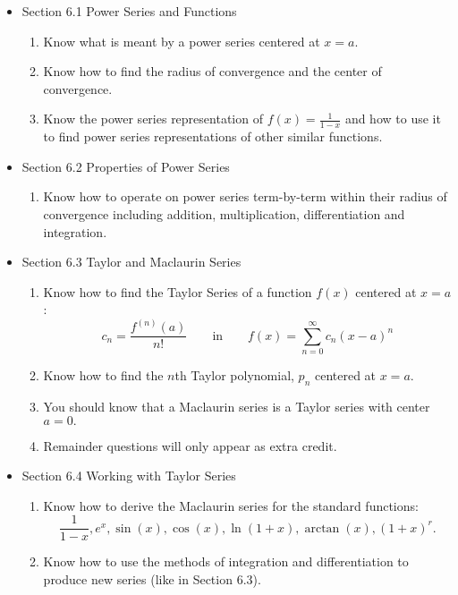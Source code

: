 \documentclass[11pt,fleqn]{article}
\begin{document}
\begin{itemize}
\item Section 6.1 Power Series and Functions\\

	\begin{enumerate}
	\item Know what is meant by a power series centered at $x=a.$
	\item Know how to find the radius of convergence and the center of convergence.
	\item Know the power series representation of $f(x)=\frac{1}{1-x}$ and how to use it to find power series representations of other similar functions.
	\end{enumerate}

\item Section 6.2 Properties of Power Series\\

	\begin{enumerate}
	\item Know how to operate on power series term-by-term within their radius of convergence including addition, multiplication, differentiation and integration.
	\end{enumerate}

\item Section 6.3 Taylor and Maclaurin Series\\

	\begin{enumerate}
	\item Know how to find the Taylor Series of a function $f(x)$ centered at $x=a$:
	$$c_n = \frac{f^{(n)}(a)}{n!} \qquad \text{in} \qquad f(x) = \sum_{n=0}^\infty c_n (x-a)^n$$
	\item Know how to find the $n$th Taylor polynomial, $p_n$ centered at $x=a.$
	\item You should know that a Maclaurin series is a Taylor series with center $a=0.$
	\item Remainder questions will only appear as extra credit.
	\end{enumerate}

\item Section 6.4 Working with Taylor Series\\

	\begin{enumerate}
	\item Know how to derive the Maclaurin series for the standard functions:
	 $$\frac{1}{1-x}, e^x, \sin(x), \cos(x), \ln(1+x), \arctan(x), (1+x)^r.$$
	\item Know how to use the methods of integration and differentiation to produce new series (like in Section 6.3).
	\end{enumerate}

\end{itemize}
\end{document}
